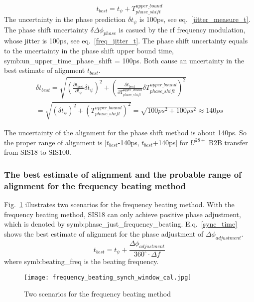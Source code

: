 \begin{equation}
t_{best} = t_{\psi} + T_{phase\_ shift}^{upper\_ bound} \label{Phase_win}
\end{equation}
The uncertainty in the phase prediction $\delta t_{\psi}$ is 100ps, see eq.~\ref{jitter_measure_t}. The phase shift uncertainty $\delta \Delta \phi_{phase}$ is casued by the rf frequency modulation, whose jitter is 100ps, see eq.~\ref{freq_jitter_t}. The phase shift uncertainty equals to the uncertainty in the phase shift upper bound time, \gls{symb:un_upper_time_phase_shift} = 100ps. Both cause an uncertainty in the best estimate of alignment $t_{best}$.
\begin{equation}
\begin{aligned}
\delta t_{best} =\sqrt {(\frac {\partial t_{best}}{\partial t_{\psi}}\delta t_{\psi})^2 + (\frac {\partial t_{best}}{\partial T_{phase\_ shift}^{upper\_ bound}}\delta T_{phase\_ shift}^{upper\_ bound})^2} \\
 =\sqrt {(\delta t_{\psi})^2+(T_{phase\_ shift}^{upper\_ bound})^2} =\sqrt { 100ps^2+100ps^2}\approx 140ps \label{Phase_uncertainty}
\end{aligned}
\end{equation}

The uncertainty of the alignment for the phase shift method is about 140ps. So the proper range of alignment is [$t_{best}$-140ps, $t_{best}$+140ps] for $U^{28+}$ B2B transfer from SIS18 to SIS100.
\subsubsection{The best estimate of alignment and the probable range of alignment for the frequency beating method}
Fig.~\ref{frequency_beating} illustrates two scenarios for the frequency beating method. With the frequency beating method, SIS18 can only achieve positive phase adjustment, which is denoted by \gls{symb:phase_just_frequency_beating}. E.q.~\ref{sync_time} shows the best estimate of alignment for the phase adjustment of $\Delta \phi_{adjustment}$.
\begin{equation}
	 t_{best} = t_{\psi}+\frac {\Delta \phi_{adjustment}}{{360^\circ} \cdot {\Delta f}} \label {sync_time}
   \end{equation}
where \gls{symb:beating_freq} is the beating frequency.
\begin{figure}[!htb]
   \centering   
   \texttt{[image: frequency\_beating\_synch\_window\_cal.jpg]}
   \caption{Two scenarios for the frequency beating method}
   \label{frequency_beating}
\end{figure}

